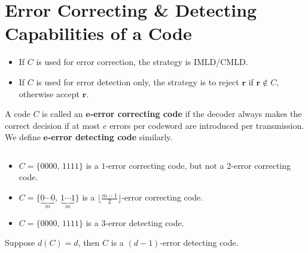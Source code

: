 
\section{Error Correcting \& Detecting Capabilities of a Code}
\begin{itemize}
    \item If $ C $ is used for error correction, the strategy is IMLD/CMLD.
    \item If $ C $ is used for error detection only, the strategy is
          to reject $ \bm{r} $ if $ \bm{r}\notin C $, otherwise accept $ \bm{r} $.
\end{itemize}
\begin{defbox}
    \begin{definition}
        A code $ C $ is called an \textbf{$\bm{e}$-error correcting code}
        if the decoder always makes the correct decision if
        at most $ e $ errors per codeword are introduced per transmission.
        We define \textbf{$\bm{e}$-error detecting code} similarly.
    \end{definition} \end{defbox}

\begin{exbox}
    \begin{example}$\;$
        \begin{itemize}
            \item $ C=\{0000,\,1111\} $ is a $ 1 $-error correcting code, but not a
                  $ 2 $-error correcting code.
            \item $ C=\{\underbrace{0\cdots 0}_{m},\,\underbrace{1\cdots 1}_{m}\} $
                  is a $ \lfloor \frac{m-1}{2} \rfloor $-error correcting code.
            \item $ C=\{0000,\,1111\} $ is a $ 3 $-error detecting code.
        \end{itemize}
    \end{example}
\end{exbox}

\begin{thmbox}
    \begin{theorem}
        Suppose $ d(C)=d $, then $ C $ is a $ (d-1) $-error detecting code.
    \end{theorem} \end{thmbox}

